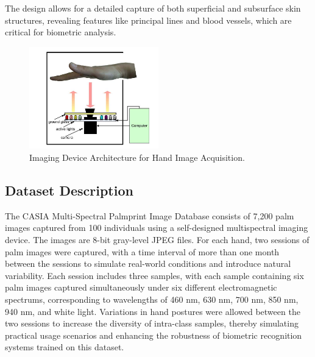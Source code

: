 The design allows for a detailed capture of both superficial and subsurface skin structures, revealing features like principal lines and blood vessels, which are critical for biometric analysis.

\begin{figure}[H]
    \centering
    \includegraphics[width=0.5\textwidth]{./images/device-architecture.png}
    \caption{Imaging Device Architecture for Hand Image Acquisition.}
    \label{fig:device_architecture}
\end{figure}

\subsection{Dataset Description}

The CASIA Multi-Spectral Palmprint Image Database consists of 7,200 palm images captured from 100 individuals using a self-designed multispectral imaging device. The images are 8-bit gray-level JPEG files. For each hand, two sessions of palm images were captured, with a time interval of more than one month between the sessions to simulate real-world conditions and introduce natural variability. Each session includes three samples, with each sample containing six palm images captured simultaneously under six different electromagnetic spectrums, corresponding to wavelengths of 460 nm, 630 nm, 700 nm, 850 nm, 940 nm, and white light. Variations in hand postures were allowed between the two sessions to increase the diversity of intra-class samples, thereby simulating practical usage scenarios and enhancing the robustness of biometric recognition systems trained on this dataset.

